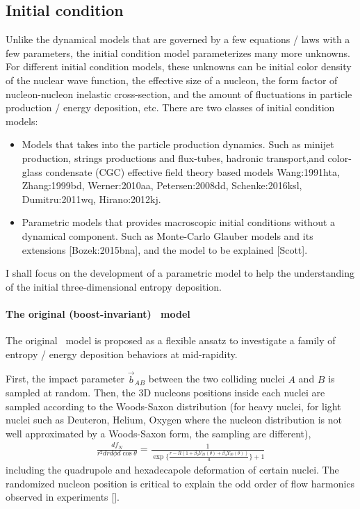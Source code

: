 \subsection{Initial condition}
Unlike the dynamical models that are governed by a few equations / laws with a few parameters, the initial condition model parameterizes many more unknowns.
For different initial condition models, these unknowns can be initial color density of the nuclear wave function, the effective size of a nucleon, the form factor of nucleon-nucleon inelastic cross-section, and the amount of fluctuations in particle production / energy deposition, etc.
There are two classes of initial condition models:
\begin{itemize}
\item Models that takes into the particle production dynamics. Such as minijet production, strings productions and flux-tubes, hadronic transport,and color-glass condensate (CGC) effective field theory based models {Wang:1991hta, Zhang:1999bd, Werner:2010aa, Petersen:2008dd, Schenke:2016ksl, Dumitru:2011wq, Hirano:2012kj}.
\item Parametric models that provides macroscopic initial conditions without a dynamical component. Such as Monte-Carlo Glauber models and its extensions [Bozek:2015bna], and the \trento model to be explained [Scott].
\end{itemize}
I shall focus on the development of a parametric model \trento to help the understanding of the initial three-dimensional entropy deposition.


\paragraph{The original (boost-invariant) \trento\ model}
The original \trento\ model is proposed as a flexible ansatz to investigate a family of entropy / energy deposition behaviors at mid-rapidity.

First, the impact parameter $\vec{b}_{AB}$ between the two colliding nuclei $A$ and $B$ is sampled at random.
Then, the 3D nucleons positions inside each nuclei are sampled according to the Woods-Saxon distribution (for heavy nuclei, for light nuclei such as Deuteron, Helium, Oxygen where the nucleon distribution is not well approximated by a Woods-Saxon form, the sampling are different),
\begin{eqnarray}
\frac{df_N}{r^2 dr d\phi d\cos\theta} = \frac{1}{\exp\{\frac{r-R(1+\beta_2 Y_{20}(\theta)+\beta_4 Y_{40}(\theta))}{a}\}+1}
\end{eqnarray}
including the quadrupole and hexadecapole deformation of certain nuclei.
The randomized nucleon position is critical to explain the odd order of flow harmonics observed in experiments [].

